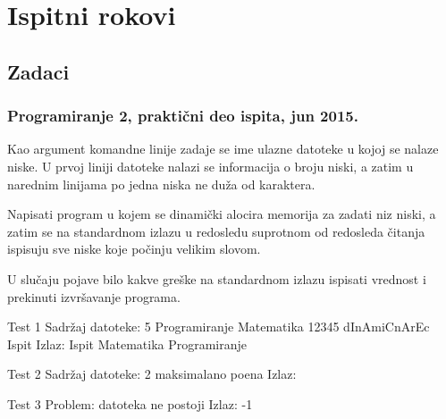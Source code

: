 
\chapter{Ispitni rokovi}

\section{Zadaci}

\subsection*{Programiranje 2, praktični deo ispita, jun 2015.}


\begin{Exercise}[label=901]

Kao argument komandne linije zadaje se ime ulazne datoteke u kojoj se nalaze niske. U prvoj liniji datoteke nalazi se informacija o broju niski, a zatim u narednim linijama po jedna niska ne duža od  karaktera.
  
Napisati program u kojem se dinamički alocira memorija za zadati niz niski, a zatim se na standardnom izlazu u redosledu suprotnom od redosleda čitanja ispisuju sve niske koje počinju velikim slovom. 

U slučaju pojave bilo kakve greške na standardnom izlazu ispisati vrednost  i prekinuti izvršavanje programa.

\begin{minitest}
\begin{test}{Test 1}
Sadržaj datoteke:  
 5                             
 Programiranje	                               
 Matematika		                         
 12345
 dInAmiCnArEc
 Ispit
Izlaz:           
 Ispit                                                                
 Matematika
 Programiranje
\end{test}
\end{minitest}
\begin{minitest}
\begin{test}{Test 2}
Sadržaj datoteke:               
  2                                             
  maksimalano               
  poena
Izlaz: 
\end{test}
\end{minitest}
\begin{minitest}
\begin{test}{Test 3}
Problem: 
  datoteka 
   ne postoji
Izlaz:    
  -1       
\end{test}
\end{minitest}


\end{Exercise}
\begin{Answer}[ref=901]
\end{Answer}


